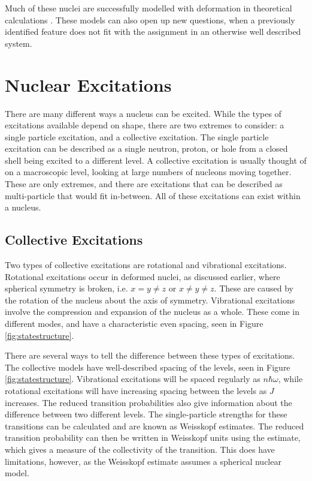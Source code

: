 

Much of these nuclei are successfully modelled with deformation in theoretical calculations \citep{delaroche10:_systematics}. These models can also open up new questions, when a previously identified feature does not fit with the assignment in an otherwise well described system.

\section{Nuclear Excitations}
\label{sec:nuc_excite}

There are many different ways a nucleus can be excited. While the types of excitations available depend on shape, there are two extremes to consider: a single particle excitation, and a collective excitation. The single particle excitation can be described as a single neutron, proton, or hole from a closed shell being excited to a different level. A collective excitation is usually thought of on a macroscopic level, looking at large numbers of nucleons moving together. These are only extremes, and there are excitations that can be described as multi-particle that would fit in-between. All of these excitations can exist within a nucleus.

\subsection{Collective Excitations}

Two types of collective excitations are rotational and vibrational excitations. Rotational excitations occur in deformed nuclei, as discussed earlier, where spherical symmetry is broken, i.e. $x=y\neq z$ or $x \neq y \neq z$. These are caused by the rotation of the nucleus about the axis of symmetry. Vibrational excitations involve the compression and expansion of the nucleus as a whole. These come in different modes, and have a characteristic even spacing, seen in Figure \ref{fig:statestructure}.



There are several ways to tell the difference between these types of excitations. The collective models have well-described spacing of the levels, seen in Figure \ref{fig:statestructure}. Vibrational excitations will be spaced regularly as $n\hbar\omega$, while rotational excitations will have increasing spacing between the levels as $J$ increases. The reduced transition probabilities also give information about the difference between two different levels. The single-particle strengths for these transitions can be calculated and are known as Weisskopf estimates. The reduced transition probability can then be written in Weisskopf units using the estimate, which gives a measure of the collectivity of the transition. This does have limitations, however, as the Weisskopf estimate assumes a spherical nuclear model.

